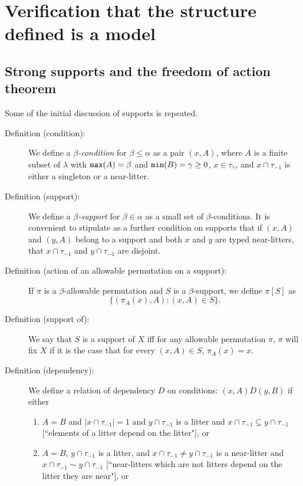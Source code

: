 \documentclass[112pt]{article}
\begin{document}
\section{Verification that the structure defined is a model}

\subsection{Strong supports and the freedom of action theorem}

Some of the initial discussion of supports is repeated.

\begin{description}

\item[Definition (condition):]  We define a {\em $\beta$-condition\/} for $\beta\leq \alpha$ as a pair $(x,A)$, where $A$ is a finite subset of $\lambda$ with ${\tt max}(A)=\beta$ and ${\tt min}(B) = \gamma \geq 0$, $x \in \tau_\gamma$, and $x \cap \tau_{-1}$ is either a singleton or a near-litter.

\item[Definition (support):]  We define a {\em $\beta$-support\/} for $\beta\in \alpha$ as a small set of $\beta$-conditions.  It is convenient to stipulate
as a further condition on supports that if $(x,A)$ and $(y,A)$ belong to a support and both $x$ and $y$ are typed near-litters, that $x \cap \tau_{-1}$ and $y \cap \tau_{-1}$ are disjoint.

\item[Definition (action of an allowable permutation on a support):]  If $\pi$ is a $\beta$-allowable permutation and $S$ is a $\beta$-support,
we define $\pi[S]$ as $$\{(\pi_A(x),A):(x,A) \in S\}.$$

\item[Definition (support of):]  We say that $S$ is a support of $X$ 
iff for any allowable permutation $\pi$, $\pi$ will fix $X$ if it is the case that for every $(x,A)\in S$, $\pi_A(x)=x$.

\item[Definition (dependency):]  We define a relation of dependency $D$ on conditions:  $(x,A)D(y,B)$  if either 

\begin{enumerate}
\item $A=B$ and $|x \cap \tau_{-1}|=1$ and $y \cap \tau_{-1}$ is a litter and $x \cap \tau_{-1} \subseteq y \cap \tau_{-1}$ [``elements of a litter depend on the litter"], or 

\item $A=B$, $y \cap \tau_{-1}$ is a litter, and $x \cap \tau_{-1} \neq y \cap \tau_{-1}$ is a near-litter and $x \cap \tau_{-1} \sim y \cap \tau_{-1}$ [``near-litters which are not litters depend on the litter they are near"], or 


\end{enumerate}
\end{description}
\end{document}
